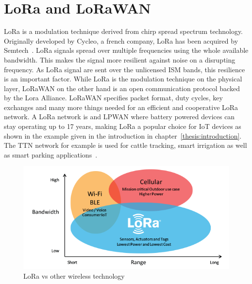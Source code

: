 \chapter{LoRa and LoRaWAN}
LoRa is a modulation technique derived from chirp
spread spectrum technology\cite{what_is_lora}. 
Originally developed by Cycleo, a french company, LoRa has been acquired by Semtech~\cite{limits_lora}.
LoRa signals spread over multiple frequencies using the whole available bandwidth.
This makes the signal more resilient against noise on a disrupting frequency. As LoRa
signal are sent over the unlicensed ISM bands, this resilience is an important factor.
While LoRa is the modulation technique on the physical layer, LoRaWAN on the other hand 
is an open communication protocol backed by the Lora Alliance. LoRaWAN specifies packet format,
duty cycles, key exchanges and many more things needed for an efficient and cooperative LoRa network.
A LoRa network is and LPWAN where battery powered devices can stay operating up to 17 years, making LoRa
a popular choice for IoT devices as shown in the example given in the introduction in chapter~\ref{thesis:introduction}. 
The TTN network for example is used for cattle tracking, smart irrigation as well as smart parking applications~\cite{ttn}.

\begin{figure}[h]
    \centering
    \includegraphics[width=1\textwidth]{figures/LoRa_context.png}
    \caption{LoRa vs other wireless technology\cite{lora_context}}
    \label{fig:lora_context}
\end{figure}

